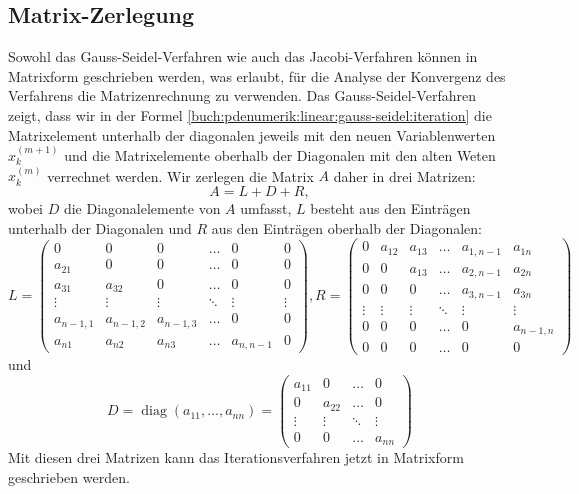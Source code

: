\subsection{Matrix-Zerlegung
\label{buch:pdenumerik:linear:subsection:matrix-zerlegung}}
Sowohl das Gauss-Seidel-Verfahren wie auch das Jacobi-Verfahren können
in Matrixform geschrieben werden, was erlaubt, für die Analyse der Konvergenz
des Verfahrens die Matrizenrechnung zu verwenden.
Das Gauss-Seidel-Verfahren zeigt, dass wir in der Formel
\eqref{buch:pdenumerik:linear:gauss-seidel:iteration}
die Matrixelement unterhalb der diagonalen jeweils mit den neuen
Variablenwerten $x_k^{(m+1)}$ und die Matrixelemente oberhalb der
Diagonalen mit den alten Weten $x_k^{(m)}$ verrechnet werden.
Wir zerlegen die Matrix $A$ daher in drei Matrizen:
\[
A = L + D + R,
\]
wobei $D$ die Diagonalelemente von $A$ umfasst, $L$ besteht aus den
Einträgen unterhalb der Diagonalen und $R$ aus den Einträgen oberhalb der
Diagonalen:
\[
L
=
\begin{pmatrix}
        0&        0&        0& \dots&        0&     0\\
   a_{21}&        0&        0& \dots&        0&     0\\
   a_{31}&   a_{32}&        0& \dots&        0&     0\\[-3pt]
   \vdots&   \vdots&   \vdots&\ddots&   \vdots&\vdots\\
a_{n-1,1}&a_{n-1,2}&a_{n-1,3}& \dots&        0&     0\\
   a_{n1}&   a_{n2}&   a_{n3}& \dots&a_{n,n-1}&     0
\end{pmatrix},
R
=
\begin{pmatrix}
     0&a_{12}&a_{13}& \dots&a_{1,n-1}&   a_{1n}\\
     0&     0&a_{13}& \dots&a_{2,n-1}&   a_{2n}\\
     0&     0&     0& \dots&a_{3,n-1}&   a_{3n}\\[-3pt]
\vdots&\vdots&\vdots&\ddots&   \vdots&   \vdots\\
     0&     0&     0& \dots&        0&a_{n-1,n}\\
     0&     0&     0& \dots&        0&        0
\end{pmatrix}
\]
und
\[
D
=
\operatorname{diag}(a_{11},\dots,a_{nn})
=
\begin{pmatrix}
a_{11}&     0& \dots&     0\\
     0&a_{22}& \dots&     0\\[-3pt]
\vdots&\vdots&\ddots&\vdots\\
     0&     0& \dots& a_{nn}
\end{pmatrix}
\]
Mit diesen drei Matrizen kann das Iterationsverfahren jetzt in
Matrixform geschrieben werden.

